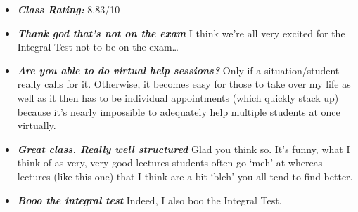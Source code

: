 \documentclass[11pt,letterpaper]{article}
\begin{document}
\begin{itemize}
\item {\bfseries\itshape Class Rating:} 8.83/10

\item {\bfseries\itshape Thank god that's not on the exam} I think we're all very excited for the Integral Test not to be on the exam\dots

\item {\bfseries\itshape Are you able to do virtual help sessions?} Only if a situation/student really calls for it. Otherwise, it becomes easy for those to take over my life as well as it then has to be individual appointments (which quickly stack up) because it's nearly impossible to adequately help multiple students at once virtually. 

\item {\bfseries\itshape Great class. Really well structured} Glad you think so. It's funny, what I think of as very, very good lectures students often go `meh' at whereas lectures (like this one) that I think are a bit `bleh' you all tend to find better.

\item {\bfseries\itshape Booo the integral test} Indeed, I also boo the Integral Test. 


\end{itemize}
\end{document}
